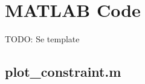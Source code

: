 \section{MATLAB Code}\label{sec:matlab}
TODO: Se template

\subsection{plot\_constraint.m}\label{sec:plot_constraint_m}

